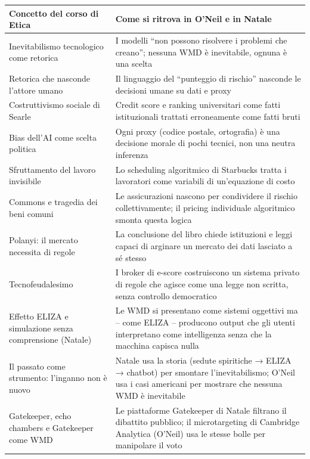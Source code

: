 \documentclass[a4paper,11pt]{article}
\begin{document}
\begin{table}[H]
\centering
\renewcommand{\arraystretch}{1.35}
\begin{tabular}{p{6cm}p{8.5cm}}
\toprule
\textbf{Concetto del corso di Etica} & \textbf{Come si ritrova in O'Neil e in Natale} \\
\midrule
Inevitabilismo tecnologico come retorica & I modelli ``non possono risolvere i problemi che creano''; nessuna WMD è inevitabile, ognuna è una scelta \\
Retorica che nasconde l'attore umano & Il linguaggio del ``punteggio di rischio'' nasconde le decisioni umane su dati e proxy \\
Costruttivismo sociale di Searle & Credit score e ranking universitari come fatti istituzionali trattati erroneamente come fatti bruti \\
Bias dell'AI come scelta politica & Ogni proxy (codice postale, ortografia) è una decisione morale di pochi tecnici, non una neutra inferenza \\
Sfruttamento del lavoro invisibile & Lo scheduling algoritmico di Starbucks tratta i lavoratori come variabili di un'equazione di costo \\
Commons e tragedia dei beni comuni & Le assicurazioni nascono per condividere il rischio collettivamente; il pricing individuale algoritmico smonta questa logica \\
Polanyi: il mercato necessita di regole & La conclusione del libro chiede istituzioni e leggi capaci di arginare un mercato dei dati lasciato a sé stesso \\
Tecnofeudalesimo & I broker di e-score costruiscono un sistema privato di regole che agisce come una legge non scritta, senza controllo democratico \\
\midrule
Effetto ELIZA e simulazione senza comprensione (Natale) & Le WMD si presentano come sistemi oggettivi ma -- come ELIZA -- producono output che gli utenti interpretano come intelligenza senza che la macchina capisca nulla \\
Il passato come strumento: l'inganno non è nuovo & Natale usa la storia (sedute spiritiche → ELIZA → chatbot) per smontare l'inevitabilismo; O'Neil usa i casi americani per mostrare che nessuna WMD è inevitabile \\
Gatekeeper, echo chambers e Gatekeeper come WMD & Le piattaforme Gatekeeper di Natale filtrano il dibattito pubblico; il microtargeting di Cambridge Analytica (O'Neil) usa le stesse bolle per manipolare il voto \\

\end{tabular}
\end{table}
\end{document}
